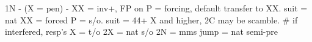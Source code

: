 1N - (X = pen) -
XX = inv+, FP on 
P = forcing, default transfer to XX.
    suit = nat    
    XX = forced
        P = s/o. suit = 44+ X and higher, 2C may be scamble.
    # if interfered, resp's X = t/o
2X = nat s/o
2N = mms
jump = nat semi-pre